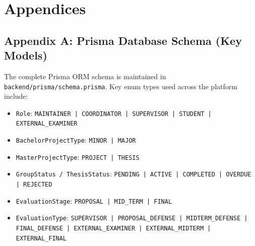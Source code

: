 \documentclass[12pt]{report}
\begin{document}









\renewcommand{\bibname}{References}



\chapter*{Appendices}

\section*{Appendix A: Prisma Database Schema (Key Models)}
The complete Prisma ORM schema is maintained in \texttt{backend/prisma/schema.prisma}. Key enum types used across the platform include:
\begin{itemize}
    \item \texttt{Role}: \texttt{MAINTAINER | COORDINATOR | SUPERVISOR | STUDENT | EXTERNAL\_EXAMINER}
    \item \texttt{BachelorProjectType}: \texttt{MINOR | MAJOR}
    \item \texttt{MasterProjectType}: \texttt{PROJECT | THESIS}
    \item \texttt{GroupStatus / ThesisStatus}: \texttt{PENDING | ACTIVE | COMPLETED | OVERDUE | REJECTED}
    \item \texttt{EvaluationStage}: \texttt{PROPOSAL | MID\_TERM | FINAL}
    \item \texttt{EvaluationType}: \texttt{SUPERVISOR | PROPOSAL\_DEFENSE | MIDTERM\_DEFENSE | FINAL\_DEFENSE | EXTERNAL\_EXAMINER | EXTERNAL\_MIDTERM | EXTERNAL\_FINAL}
\end{itemize}
\end{document}

